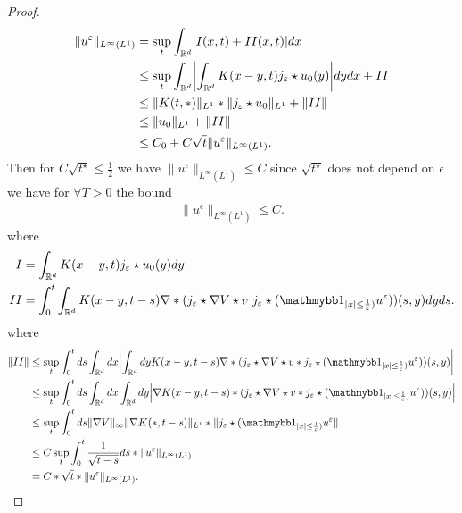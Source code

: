   \begin{proof}
    
     \begin{align*}
       \|u^{\epsilon} \|_{L^{\infty}(L^{1} ) } &= \sup_{t} \int_{\mathbb{R}^{d} }\abs*{I(x,t) + II(x,t)}dx\\
                                               &\le \sup_t \int_{\mathbb{R}^{d} } \abs*{\int_{\mathbb{R}^{d} } K(x-y,t)j_{\epsilon} \star u_{0}(y)} dy dx + II\\
                                               &\le \|K(t,*)\|_{L^{1} } * \|j_{\epsilon} \star  u_0\|_{L^{1} } + \|II\|\\
                                               &\le \|u_0\|_{L^{1} } + \|II\| \\
                                               &\le C_0 + C \sqrt{t}  \|u^{\epsilon} \|_{L^{\infty}(L^{1} ) }
     .\end{align*}
 Then for $C \sqrt{t^{\star }} \le \frac{1}{2}$ we have $\|u^{\epsilon} \|_{L^{\infty}(L^{1} ) } \le C$ 
 since $\sqrt{t^{\star }}$ does not depend on $\epsilon$ we have for $\forall  T>0$ the bound 
 \begin{align*}
   \|u^{\epsilon} \|_{L^{\infty}(L^{1} ) }\le C
 .\end{align*}
 where 
 \begin{align*}
   I &= \int_{\mathbb{R}^{d} } K(x-y,t)j_{\epsilon} \star u_{0}(y) dy \\
   II &= \int_0^{t}  \int_{\mathbb{R}^{d} } K(x-y,t-s) \nabla*(j_{\epsilon} \star \nabla V \star  v \ j_{\epsilon} \star  (\cha_{\abs{x} \le  \frac{1}{\epsilon})} u^{\epsilon} ))(s,y) dy ds
 .\end{align*}
 where 
 \begin{align*}
   \|II\| &\le  \sup_t \int_0^{t} ds \int_{\mathbb{R}^{d} }  dx \abs*{\int_{\mathbb{R}^{d} } dy K(x-y,t-s) \nabla*(j_{\epsilon} \star \nabla V \star  v * j_{\epsilon}\star  (\cha_{\abs{x} \le  \frac{1}{\epsilon})} u^{\epsilon} ))(s,y)}\\
          &\le \sup_t \int_0^{t} ds \int_{\mathbb{R}^{d} }  dx \int_{\mathbb{R}^{d} } dy \abs*{\nabla K(x-y,t-s) * (j_{\epsilon} \star \nabla V \star  v * j_{\epsilon} \star  (\cha_{\abs{x} \le  \frac{1}{\epsilon})} u^{\epsilon} ))(s,y)}\\
          &\le  \sup_{t} \int_0^{t} ds \|\nabla V\| _{\infty}  \|\nabla K(*,t-s) \|_{L^{1} }* \|j_{\epsilon} \star  (\cha_{\abs{x} \le  \frac{1}{\epsilon})} u^{\epsilon}\|\\
          &\le C \sup_{t} \int_0^{t}  \frac{1}{\sqrt{t-s} } ds *\|u^{\epsilon} \|_{L^{\infty}(L^{1} ) }\\
          &= C*\sqrt{t} *\|u^{\epsilon} \|_{L^{\infty}(L^{1} ) }
 .\end{align*}
   \end{proof}
